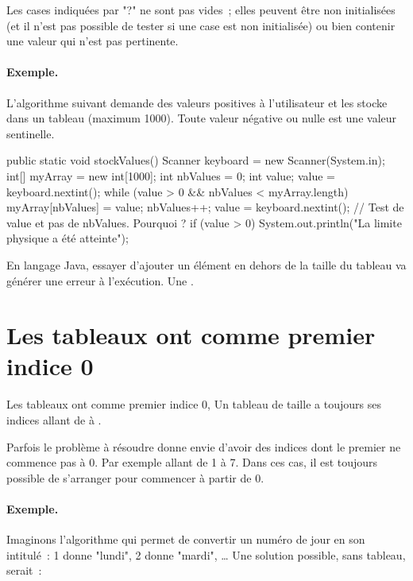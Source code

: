 		Les cases indiquées par "?" ne sont pas vides~;
		elles peuvent être non initialisées
		(et il n'est pas possible de tester si une case est non initialisée)
		ou bien contenir une valeur qui n’est pas pertinente.
		
		\paragraph{Exemple.}
		L’algorithme suivant demande des valeurs positives à l’utilisateur et
		les stocke dans un tableau (maximum 1000).  Toute valeur négative ou
		nulle est une valeur sentinelle.

		\begin{java}
public static void stockValues(){
	Scanner keyboard = new Scanner(System.in);
	int[] myArray = new int[1000];
	int nbValues = 0;
	int value;
	value = keyboard.nextint();
	while (value > 0 && nbValues < myArray.length){
		myArray[nbValues] = value;
		nbValues++;
		value = keyboard.nextint();
	}
	// Test de value et pas de nbValues. Pourquoi ?
	if (value > 0){
		System.out.println("La limite physique a été atteinte");
	}
}			
		\end{java}
		
		En langage Java, essayer d'ajouter un élément en dehors de la taille du
		tableau va générer une erreur à l'exécution. Une
		. 

		
	\section{Les tableaux ont comme premier indice 0} 

		Les tableaux ont comme premier indice 0, Un tableau de taille 
		a toujours ses indices allant de  à . 

		Parfois le problème à résoudre donne envie d'avoir des indices dont le
		premier ne commence pas à 0. Par exemple allant de 1 à 7. Dans ces cas,
		il est toujours possible de s'arranger pour commencer à partir de 0. 

		\paragraph{Exemple.}
		Imaginons l’algorithme qui permet de convertir un numéro
		de jour en son intitulé~: 1 donne "lundi", 2 donne "mardi",
		\dots{}
		Une solution possible, sans tableau, serait~:
		
